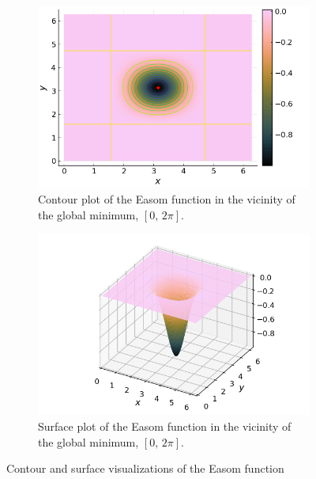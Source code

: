 \begin{figure}[ht!]
\begin{subfigure}[b]{0.45\textwidth}
      \includegraphics[width=\textwidth]
        {img/test_functions/easom_contour_closeup.png}
      \caption{
        Contour plot of the Easom function in the vicinity of the global minimum,
        \([0,\, 2\pi]\).
      }
      \label{fig:app:test:easom:contour:closeup}
    \end{subfigure}
    \hfill
    \begin{subfigure}[b]{0.45\textwidth}
      \centering
      \includegraphics[width=\textwidth]
        {img/test_functions/easom_surface_closeup.png}
      \caption{
        Surface plot of the Easom function in the vicinity of the global minimum,
        \([0,\, 2\pi]\).
      }
      \label{fig:app:test:easom:surface:closeup}
    \end{subfigure}
    \caption{Contour and surface visualizations of the Easom function}
    \label{fig:app:test:easom}
  \end{figure}
